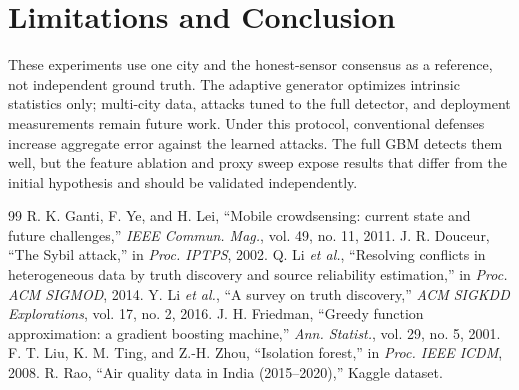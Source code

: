 \documentclass[conference]{IEEEtran}
\begin{document}
\section{Limitations and Conclusion}
These experiments use one city and the honest-sensor consensus as a reference, not independent ground truth. The adaptive generator optimizes intrinsic statistics only; multi-city data, attacks tuned to the full detector, and deployment measurements remain future work. Under this protocol, conventional defenses increase aggregate error against the learned attacks. The full GBM detects them well, but the feature ablation and proxy sweep expose results that differ from the initial hypothesis and should be validated independently.
\begin{thebibliography}{99}
 R. K. Ganti, F. Ye, and H. Lei, ``Mobile crowdsensing: current state and future challenges,'' \emph{IEEE Commun. Mag.}, vol. 49, no. 11, 2011.
 J. R. Douceur, ``The Sybil attack,'' in \emph{Proc. IPTPS}, 2002.
 Q. Li \emph{et al.}, ``Resolving conflicts in heterogeneous data by truth discovery and source reliability estimation,'' in \emph{Proc. ACM SIGMOD}, 2014.
 Y. Li \emph{et al.}, ``A survey on truth discovery,'' \emph{ACM SIGKDD Explorations}, vol. 17, no. 2, 2016.
 J. H. Friedman, ``Greedy function approximation: a gradient boosting machine,'' \emph{Ann. Statist.}, vol. 29, no. 5, 2001.
 F. T. Liu, K. M. Ting, and Z.-H. Zhou, ``Isolation forest,'' in \emph{Proc. IEEE ICDM}, 2008.
 R. Rao, ``Air quality data in India (2015--2020),'' Kaggle dataset.
\end{thebibliography}
\end{document}
